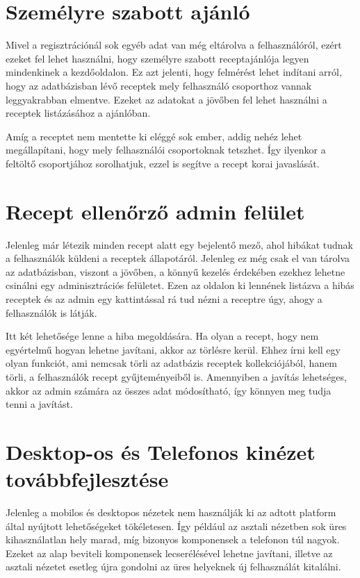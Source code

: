 \documentclass[12pt]{report}
\theoremstyle{definition}
\begin{document}
\section{Személyre szabott ajánló}
Mivel a regisztrációnál sok egyéb adat van még eltárolva a felhasználóról, ezért ezeket fel lehet használni, hogy személyre szabott receptajánlója legyen mindenkinek a kezdőoldalon. Ez azt jelenti, hogy felmérést lehet indítani arról, hogy az adatbázisban lévő receptek mely felhasználó csoporthoz vannak leggyakrabban elmentve. Ezeket az adatokat a jövőben fel lehet használni a  receptek listázásához a ajánlóban. 

Amíg a receptet nem mentette ki eléggé sok ember, addig nehéz lehet megállapítani, hogy mely felhasználói csoportoknak tetszhet. Így ilyenkor a feltöltő csoportjához sorolhatjuk, ezzel is segítve a recept korai javaslását.


\section{Recept ellenőrző admin felület}
Jelenleg már létezik minden recept alatt egy bejelentő mező, ahol hibákat tudnak a felhasználók küldeni a receptek állapotáról. Jelenleg ez még csak el van tárolva az adatbázisban, viszont a jövőben, a könnyű kezelés érdekében ezekhez lehetne csinálni egy adminisztrációs felületet. Ezen az oldalon ki lennének listázva a hibás receptek és az admin egy kattintással rá tud nézni a receptre úgy, ahogy a felhasználók is látják.

Itt két lehetősége lenne a hiba megoldására. Ha olyan a recept, hogy nem egyértelmű hogyan lehetne javítani, akkor az törlésre kerül. Ehhez írni kell egy olyan funkciót, ami nemcsak törli az adatbázis receptek kollekciójából, hanem törli,  a felhasználók  recept gyűjteményeiből is. Amennyiben a javítás lehetséges, akkor az admin számára az összes adat módosítható, így könnyen meg tudja tenni a javítást.


\section{Desktop-os és Telefonos kinézet továbbfejlesztése}
Jelenleg a mobilos és desktopos nézetek nem használják ki az adtott platform által nyújtott lehetőségeket tökéletesen. Így például az asztali nézetben sok üres kihasználatlan hely marad, míg bizonyos komponensek a telefonon túl nagyok. Ezeket az alap beviteli komponensek lecserélésével lehetne javítani, illetve az asztali nézetet esetleg újra gondolni az üres helyeknek új felhasználát kitalálni.  
\end{document}
